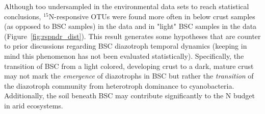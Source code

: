 Although too undersampled in the environmental data sets to reach statistical
conclusions, $^{15}$N-responsive OTUs were found more often in below
crust samples (as opposed to BSC samples) in the \citet{Steven_2013} data and
in "light" BSC samples in the \citet{Garcia_Pichel_2013} data
(Figure~\ref{fig:rspndr_dist}). This result generates some hypotheses that
are counter to prior discussions regarding BSC diazotroph temporal dynamics
(keeping in mind this phenomenon has not been evaluated statistically).
Specifically, the transition of BSC from a light colored, developing crust to
a dark, mature crust may not mark the \textit{emergence} of diazotrophs in
BSC but rather the \textit{transition} of the diazotroph community from
heterotroph dominance to cyanobacteria.  Additionally, the soil beneath BSC
may contribute significantly to the N budget in arid ecosystems.

